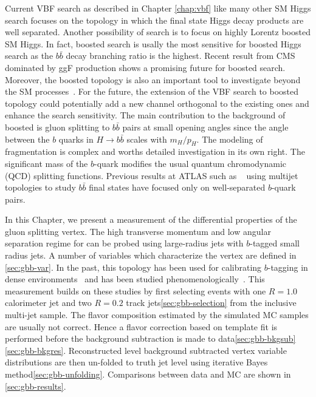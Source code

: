 Current VBF \Hbb search as described in Chapter \ref{chap:vbf} like many other SM Higgs search focuses on the topology in which the final state Higgs decay products are well separated. Another possibility of \Hbb search is to focus on highly Lorentz boosted SM Higgs. In fact, boosted \Hbb search is usally the most sensitive for boosted Higgs search as the $b\bar b$ decay branching ratio is the highest. Recent result from CMS dominated by ggF production \cite{Aaboud:2017ecz} shows a promising future for boosted \Hbb search. Moreover, the boosted \Hbb topology is also an important tool to investigate beyond the SM processes~\cite{Aaboud:2017ahz,Aaboud:2017yqz,Aaboud:2016xco,Khachatryan:2016cfa,Sirunyan:2017nrt}. For the future, the extension of the VBF \Hbb search to boosted topology could potentially add a new channel orthogonal to the existing ones and enhance the search sensitivity. The main contribution to the background of boosted \Hbb is gluon splitting to $b \bar{b}$ pairs at small opening angles since the angle between the $b$ quarks in $H\rightarrow b\bar{b}$ scales with $m_H/p_H$. The modeling of \gbb fragmentation is complex and worths detailed investigation in its own right. The significant mass of the $b$-quark modifies the usual quantum chromodynamic (QCD) splitting functions. Previous results at ATLAS such as ~\cite{Aaboud:2016jed} using multijet topologies to study $b\bar b$ final states have focused only on well-separated $b$-quark pairs. 

In this Chapter, we present a measurement of the differential properties of the gluon splitting vertex. The high transverse momentum and low angular separation regime for \gbb can be probed using large-radius jets with $b$-tagged small radius jets. A number of variables which characterize the \gbb vertex are defined in \ref{sec:gbb-var}. In the past, this topology has been used for calibrating $b$-tagging in dense environments~\cite{ATLAS-CONF-2016-039,ATLAS-CONF-2016-002,CMS:2013vea} and has been studied phenomenologically~\cite{Anderle:2017qwx,Ilten:2017rbd}. This measurement builds on these studies by first selecting events with one $R=1.0$ calorimeter jet and two $R=0.2$ track jets\ref{sec:gbb-selection} from the inclusive multi-jet sample. The flavor composition estimated by the simulated MC samples are usually not correct. Hence a flavor correction based on \sdzero template fit is performed before the background subtraction is made to data\ref{sec:gbb-bkgsub}\ref{sec:gbb-bkgres}. Reconstructed level background subtracted \gbb vertex variable distributions are then un-folded to truth jet level using iterative Bayes method\ref{sec:gbb-unfolding}. Comparisons between data and MC are shown in \ref{sec:gbb-results}.
